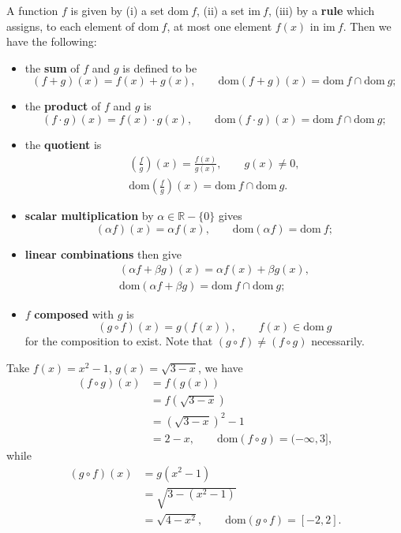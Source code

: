 \documentclass[letter-paper]{tufte-book}
\newenvironment{example}[1][Example]{\begin{trivlist}
\item[\hskip \labelsep {\bfseries #1}]}{\end{trivlist}}
\newcommand\Def[1]{\textbf{#1}}
\begin{document}
A function $f$ is given by (i) a set $\mbox{dom}\ f$, (ii) a set $\mbox{im}\
f$, (iii) by a \Def{rule} which assigns, to each element of $\mbox{dom}\
f$, at most one element $f(x)$ in $\mbox{im}\ f$. Then we have the following:
\begin{itemize}
  \item the \Def{sum} of $f$ and $g$ is defined to be
  \begin{equation*}
    (f+g)(x)=f(x)+g(x),\qquad \mbox{dom}(f+g)(x)=\mbox{dom}\ f\cap\mbox{dom}\ g;
  \end{equation*}
  \item the \Def{product} of $f$ and $g$ is
  \begin{equation*}
    (f\cdot g)(x)=f(x)\cdot g(x),\qquad
    \mbox{dom}(f\cdot g)(x)=\mbox{dom}\ f\cap\mbox{dom}\ g;
  \end{equation*}
  \item the \Def{quotient} is
  \begin{align*}
    \left(\frac{f}{g}\right)(x)=\frac{f(x)}{g(x)},\qquad g(x)\neq0,\\
    \mbox{dom}\left(\frac{f}{g}\right)(x)=\mbox{dom}\ f\cap\mbox{dom}\ g.
  \end{align*}
  \item \Def{scalar multiplication} by $\alpha\in\mathbb{R}-\{0\}$ gives
  \begin{equation*}
    (\alpha f)(x)=\alpha f(x),\qquad \mbox{dom}(\alpha f)=\mbox{dom}\ f;
  \end{equation*}
  \item \Def{linear combinations} then give
  \begin{align*}
    (\alpha f+\beta g)(x)=\alpha f(x) + \beta g(x),\\
    \mbox{dom}(\alpha f+\beta g) = \mbox{dom}\ f \cap \mbox{dom}\ g;
  \end{align*}
  \item $f$ \Def{composed} with $g$ is
  \begin{equation*}
    (g \circ f)(x)=g(f(x)),\qquad f(x)\in\mbox{dom}\ g
  \end{equation*}
  for the composition to exist. Note that $(g\circ f)\neq(f\circ g)$ 
  necessarily.
\end{itemize}
\begin{example}
  Take $f(x)=x^2-1$, $g(x)=\sqrt{3-x}$, we have
  \begin{align*}
    (f\circ g)(x) &= f(g(x)) \\
      &= f(\sqrt{3-x}) \\
      &= (\sqrt{3-x})^2 - 1 \\
      &= 2-x,\qquad \mbox{dom}(f\circ g)=(-\infty,3],
  \end{align*}
  while
  \begin{align*}
    (g\circ f)(x) &= g(x^2-1) \\
      &= \sqrt{3-(x^2-1)} \\
      &= \sqrt{4-x^2},\qquad \mbox{dom}(g\circ f)=[-2,2].
  \end{align*}
\end{example}
\end{document}
